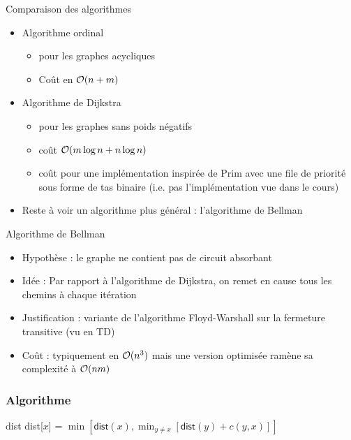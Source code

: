 


\begin{frame}{Comparaison des algorithmes}
    \begin{itemize}
        \item Algorithme ordinal 
        \begin{itemize}
            \item pour les graphes acycliques 
            \item Coût en ${\cal O}(n+m)$
        \end{itemize}
        \item Algorithme de Dijkstra 
        \begin{itemize}
            \item pour les graphes sans poids négatifs 
            \item coût ${\cal O}(m \log n + n \log n)$
            \item coût pour une implémentation inspirée de Prim avec une file de priorité sous forme de tas binaire (i.e. pas l'implémentation vue dans le cours)
        \end{itemize}
        \item Reste à voir un algorithme plus général : l'algorithme de Bellman 
    \end{itemize}
\end{frame}


\begin{frame}{Algorithme de Bellman}
    \begin{itemize}
        \item Hypothèse : le graphe ne contient pas de circuit absorbant
        \item Idée : Par rapport à l'algorithme de Dijkstra, on remet en cause tous les chemins à chaque itération 
        \item Justification : variante de l'algorithme Floyd-Warshall sur la fermeture transitive (vu en TD)
        \item Coût : typiquement en ${\cal O}(n^3)$ mais une version optimisée ramène sa complexité à ${\cal O}(nm)$
    \end{itemize}
\end{frame}

\begin{frame}[fragile]
    \frametitle{Algorithme}
    \begin{algorithmic}
            \State dist 
                    \State dist[$x$] = $\min [ \mathsf{dist}(x) , \min_{y \neq x} [ \mathsf{dist}(y) + c(y,x)]]$ 
                \EndFor
            \EndFor 
            \EndFunction        
    \end{algorithmic}
\end{frame}

